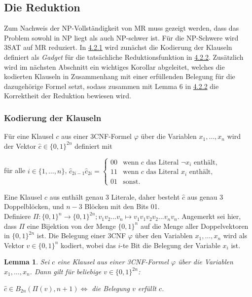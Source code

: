 \documentclass[11pt]{article}
\newtheorem{lemma}{Lemma}
\theoremstyle{break}
\theoremstyle{norm}
\begin{document}
\subsection{Die Reduktion}
Zum Nachweis der NP-Vollständigkeit von MR muss gezeigt werden, dass das Problem sowohl in NP liegt als auch NP-schwer ist.
Für die NP-Schwere wird 3SAT auf MR reduziert. In \hyperref[kod]{4.2.1} wird zunächst die Kodierung der Klauseln definiert als \textit{Gadget} für die tatsächliche Reduktionsfunktion in \hyperref[red]{4.2.2}. Zusätzlich wird im nächsten Abschnitt ein wichtiges Korollar abgeleitet, welches die kodierten Klauseln in Zusammenhang mit einer erfüllenden Belegung für die dazugehörige Formel setzt, sodass zusammen mit Lemma 6 in \hyperref[red]{4.2.2} die Korrektheit der Reduktion bewiesen wird.
\subsubsection{Kodierung der Klauseln}\label{kod}
Für eine Klausel $c$ aus einer 3CNF-Formel $\varphi$ über die Variablen $x_1,\ldots,x_n$ wird der Vektor $\hat{c}\in\{0,1\}^{2n}$ definiert mit
\begin{center}
für alle $i\in\{1,\ldots,n\}$, $\hat{c}_{2i-1}\hat{c}_{2i}=
\begin{cases}
00 & \text{wenn } c \text{ das Literal } \neg x_i \text{ enthält},\\
11 & \text{wenn } c \text{ das Literal } x_i \text{ enthält},\\
01 & \text{sonst}.
\end{cases}$
\end{center}
Eine Klausel $c$ aus enthält genau 3 Literale, daher besteht $\hat{c}$ aus genau 3 Doppelblöcken, und $n-3$ Blöcken mit den Bits 01.\\
Definiere $\Pi: \{0,1\}^n \to \{0,1\}^{2n}; v_1v_2...v_n \mapsto v_1v_1v_2v_2...v_nv_n$. Angemerkt sei hier, dass $\Pi$ eine Bijektion von der Menge $\{0,1\}^n$ auf die Menge aller Doppelvektoren in $\{0,1\}^{2n}$ ist. Die Belegung einer 3CNF $\varphi$ über den Variablen $x_1,\ldots,x_n$ wird als Vektor $v\in\{0,1\}^n$ kodiert, wobei das $i$-te Bit die Belegung der Variable $x_i$ ist.
\begin{lemma}
Sei $c$ eine Klausel aus einer 3CNF-Formel $\varphi$ über die Variablen $x_1,\ldots,x_n$. Dann gilt für beliebige $v \in \{0,1\}^{2n}$:
\begin{center}
    $\hat{c}\in B_{2n}(\Pi(v), n+1) \Leftrightarrow$ die Belegung $v$ erfüllt $c$.
\end{center}
\end{lemma}
\end{document}
